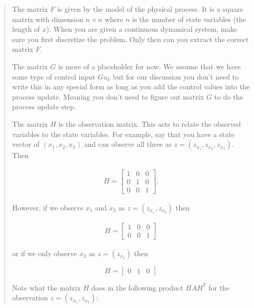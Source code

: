 \begin{quote}
The matrix \(F\) is given by the model of the physical process. It is a
square matrix with dimension \(n \times n\) where \(n\) is the number of
state variables (the length of \(x\)). When you are given a continuous
dynamical system, make sure you first discretize the problem. Only then
can you extract the correct matrix \(F\).

The matrix \(G\) is more of a placeholder for now. We assume that we
have some type of control input \(Gu_k\) but for our discussion you
don't need to write this in any special form as long as you add the
control values into the process update. Meaning you don't need to figure
out matrix \(G\) to do the process update step.

The matrix \(H\) is the observation matrix. This acts to relate the
observed variables to the state variables. For example, say that you
have a state vector of \((x_1, x_2, x_3)\) and can observe all three as
\(z = (z_{x_1}, z_{x_2}, z_{x_3})\). Then

\[\begin{aligned}
H = \begin{bmatrix} 1 & 0 & 0 \\ 0 & 1 & 0\\ 0 & 0 &1 \end{bmatrix}.
\end{aligned}\]

However, if we observe \(x_1\) and \(x_3\) as \(z = (z_{x_1}, z_{x_3})\)
then

\[\begin{aligned}
H = \begin{bmatrix} 1 & 0 & 0 \\ 0 & 0 &1 \end{bmatrix}
\end{aligned}\]

or if we only observe \(x_2\) as \(z = (z_{x_2})\) then

\[H = \begin{bmatrix} 0 & 1 & 0  \end{bmatrix}\]

Note what the matrix \(H\) does in the following product \(H A H^T\) for
the observation \(z = (z_{x_1}, z_{x_3})\):


\end{quote}

